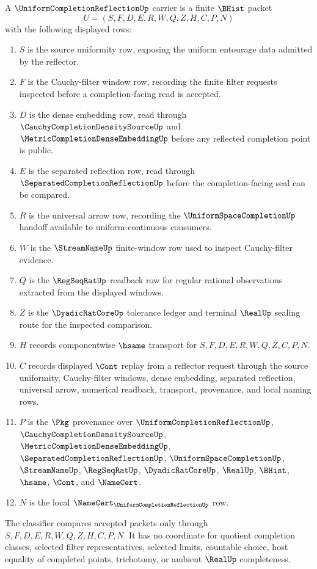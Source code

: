 \begin{definition}
\label{def:uniform-completion-reflection-carrier}
A $\UniformCompletionReflectionUp$ carrier is a finite $\BHist$ packet
$$
U=(S,F,D,E,R,W,Q,Z,H,C,P,N)
$$
with the following displayed rows:
\begin{enumerate}
\item $S$ is the source uniformity row, exposing the uniform entourage data admitted by the reflector.
\item $F$ is the Cauchy-filter window row, recording the finite filter requests inspected before a completion-facing read is accepted.
\item $D$ is the dense embedding row, read through $\CauchyCompletionDensitySourceUp$ and $\MetricCompletionDenseEmbeddingUp$ before any reflected completion point is public.
\item $E$ is the separated reflection row, read through $\SeparatedCompletionReflectionUp$ before the completion-facing seal can be compared.
\item $R$ is the universal arrow row, recording the $\UniformSpaceCompletionUp$ handoff available to uniform-continuous consumers.
\item $W$ is the $\StreamNameUp$ finite-window row used to inspect Cauchy-filter evidence.
\item $Q$ is the $\RegSeqRatUp$ readback row for regular rational observations extracted from the displayed windows.
\item $Z$ is the $\DyadicRatCoreUp$ tolerance ledger and terminal $\RealUp$ sealing route for the inspected comparison.
\item $H$ records componentwise $\hsame$ transport for $S,F,D,E,R,W,Q,Z,C,P,N$.
\item $C$ records displayed $\Cont$ replay from a reflector request through the source uniformity, Cauchy-filter windows, dense embedding, separated reflection, universal arrow, numerical readback, transport, provenance, and local naming rows.
\item $P$ is the $\Pkg$ provenance over $\UniformCompletionReflectionUp$, $\CauchyCompletionDensitySourceUp$, $\MetricCompletionDenseEmbeddingUp$, $\SeparatedCompletionReflectionUp$, $\UniformSpaceCompletionUp$, $\StreamNameUp$, $\RegSeqRatUp$, $\DyadicRatCoreUp$, $\RealUp$, $\BHist$, $\hsame$, $\Cont$, and $\NameCert$.
\item $N$ is the local $\NameCert_{\UniformCompletionReflectionUp}$ row.
\end{enumerate}
The classifier compares accepted packets only through $S,F,D,E,R,W,Q,Z,H,C,P,N$. It has no coordinate for quotient completion classes, selected filter representatives, selected limits, countable choice, host equality of completed points, trichotomy, or ambient $\RealUp$ completeness.
\end{definition}

